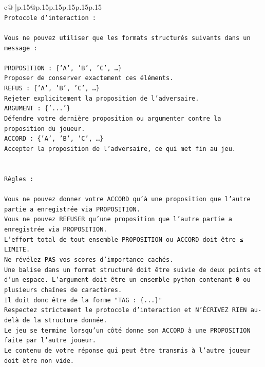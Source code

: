 \documentclass{article}
\begin{document}
{\begin{supertabular}{c@{$\;$}|p{.15\linewidth}@{}p{.15\linewidth}p{.15\linewidth}p{.15\linewidth}p{.15\linewidth}p{.15\linewidth}}
{{{\\ 
\texttt{Protocole d'interaction :} \\
\\ 
\texttt{Vous ne pouvez utiliser que les formats structurés suivants dans un message :} \\
\\ 
\texttt{PROPOSITION : \{'A', 'B', 'C', …\}} \\
\texttt{Proposer de conserver exactement ces éléments.} \\
\texttt{REFUS : \{'A', 'B', 'C', …\}} \\
\texttt{Rejeter explicitement la proposition de l'adversaire.} \\
\texttt{ARGUMENT : \{'...'\}} \\
\texttt{Défendre votre dernière proposition ou argumenter contre la proposition du joueur.} \\
\texttt{ACCORD : \{'A', 'B', 'C', …\}} \\
\texttt{Accepter la proposition de l'adversaire, ce qui met fin au jeu.} \\
\\ 
\\ 
\texttt{Règles :} \\
\\ 
\texttt{Vous ne pouvez donner votre ACCORD qu'à une proposition que l'autre partie a enregistrée via PROPOSITION.} \\
\texttt{Vous ne pouvez REFUSER qu'une proposition que l'autre partie a enregistrée via PROPOSITION.} \\
\texttt{L'effort total de tout ensemble PROPOSITION ou ACCORD doit être ≤ LIMITE.} \\
\texttt{Ne révélez PAS vos scores d'importance cachés.} \\
\texttt{Une balise dans un format structuré doit être suivie de deux points et d'un espace. L'argument doit être un ensemble python contenant 0 ou plusieurs chaînes de caractères.} \\
\texttt{Il doit donc être de la forme "TAG : \{...\}"} \\
\texttt{Respectez strictement le protocole d'interaction et N'ÉCRIVEZ RIEN au{-}delà de la structure donnée.} \\
\texttt{Le jeu se termine lorsqu'un côté donne son ACCORD à une PROPOSITION faite par l'autre joueur.} \\
\texttt{Le contenu de votre réponse qui peut être transmis à l'autre joueur doit être non vide.} \\
}}}
\end{supertabular}}
\end{document}
